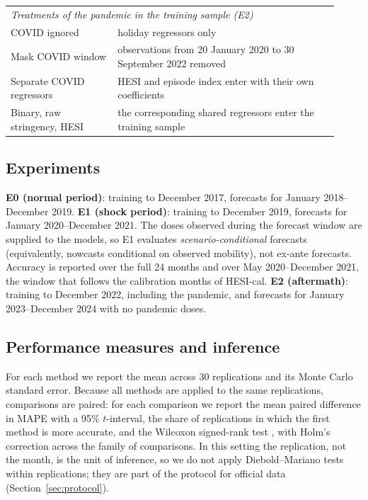 \documentclass{article}
\theoremstyle{plain}
\theoremstyle{definition}
\theoremstyle{remark}
\begin{document}
\begin{table}[t]
\begin{tabular}{p{0.30\linewidth}p{0.62\linewidth}}
\midrule
\multicolumn{2}{l}{\textit{Treatments of the pandemic in the training sample (E2)}} \\
COVID ignored & holiday regressors only \\
Mask COVID window & observations from 20 January 2020 to 30 September 2022 removed \\
Separate COVID regressors & HESI and episode index enter with their own coefficients \\
Binary, raw stringency, HESI & the corresponding shared regressors enter the training sample \\
\bottomrule
\end{tabular}
\end{table}

\subsection{Experiments}
\textbf{E0 (normal period)}: training to December 2017, forecasts for January 2018--December 2019. \textbf{E1 (shock period)}: training to December 2019, forecasts for January 2020--December 2021. The doses observed during the forecast window are supplied to the models, so E1 evaluates \emph{scenario-conditional} forecasts (equivalently, nowcasts conditional on observed mobility), not ex-ante forecasts. Accuracy is reported over the full 24 months and over May 2020--December 2021, the window that follows the calibration months of HESI-cal. \textbf{E2 (aftermath)}: training to December 2022, including the pandemic, and forecasts for January 2023--December 2024 with no pandemic doses.

\subsection{Performance measures and inference}
For each method we report the mean across 30 replications and its Monte Carlo standard error. Because all methods are applied to the same replications, comparisons are paired: for each comparison we report the mean paired difference in MAPE with a 95\% $t$-interval, the share of replications in which the first method is more accurate, and the Wilcoxon signed-rank test \citep{wilcoxon1945individual}, with Holm's correction across the family of comparisons. In this setting the replication, not the month, is the unit of inference, so we do not apply Diebold--Mariano tests \citep{diebold1995comparing, harvey1997testing} within replications; they are part of the protocol for official data (Section~\ref{sec:protocol}).
\end{document}

